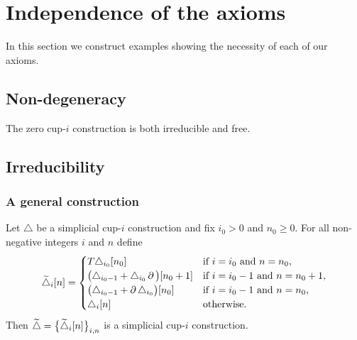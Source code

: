 \section{Independence of the axioms}

In this section we construct examples showing the necessity of each of our axioms.

\subsection{Non-degeneracy}

The zero \mbox{cup-$i$} construction is both irreducible and free.

\subsection{Irreducibility}

\subsubsection{A general construction}

\begin{lemma}
	Let $\triangle$ be a simplicial \mbox{cup-$i$} construction and fix $i_0 > 0$ and $n_0 \geq 0$.
	For all non-negative integers $i$ and $n$ define
	\[
	\widetilde\triangle_i[n] =
	\begin{cases}
		T\triangle_{i_0}[n_0] & \text{if }i=i_0 \text{ and } n=n_0, \\
		\big(\triangle_{i_0-1} + \triangle_{i_0}\bd\big)[n_0+1] & \text{if }i=i_0-1 \text{ and } n=n_0+1, \\
		\big(\triangle_{i_0-1} + \bd\triangle_{i_0}\big)[n_0] & \text{if }i=i_0-1 \text{ and } n=n_0, \\
		\triangle_{i}[n] & \text{otherwise}.
	\end{cases}
	\]
	Then $\widetilde\triangle = \set[\big]{\widetilde\triangle_i[n]}_{i,n}$ is a simplicial \mbox{cup-$i$} construction.
\end{lemma}

